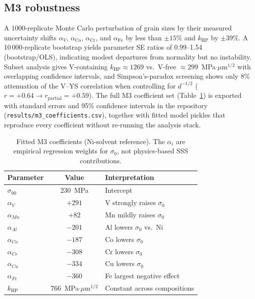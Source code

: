 \documentclass[11pt]{article}
\begin{document}
\subsection{M3 robustness}
A 1000-replicate Monte Carlo perturbation of grain sizes by their measured uncertainty shifts $\alpha_V$, $\alpha_\text{Co}$, $\alpha_\text{Cr}$, and $\alpha_\text{Fe}$ by less than $\pm 15\%$ and $k_\text{HP}$ by $\pm 39\%$. A 10\,000-replicate bootstrap yields parameter SE ratios of 0.99--1.54 (bootstrap/OLS), indicating modest departures from normality but no instability. Subset analysis gives V-containing $k_\text{HP} \approx 1269$ vs.\ V-free $\approx 299$~MPa$\cdot\mu$m$^{1/2}$ with overlapping confidence intervals, and Simpson's-paradox screening shows only 8\% attenuation of the V--YS correlation when controlling for $d^{-1/2}$ ($r = +0.64 \to r_\text{partial} = +0.59$). The full M3 coefficient set (Table~\ref{tab:m3_coef}) is exported with standard errors and 95\% confidence intervals in the repository (\texttt{results/m3\_coefficients.csv}), together with fitted model pickles that reproduce every coefficient without re-running the analysis stack.

\begin{table}[htb]
\centering
\caption{Fitted M3 coefficients (Ni-solvent reference). The $\alpha_i$ are empirical regression weights for $\sigma_0$, not physics-based SSS contributions.}
\label{tab:m3_coef}
\small
\begin{tabular}{lcl}
\toprule
Parameter & Value & Interpretation \\
\midrule
$\sigma_{00}$ & 230~\si{MPa} & Intercept \\
$\alpha_V$    & $+291$ & V strongly raises $\sigma_0$ \\
$\alpha_{Mn}$ & $+82$  & Mn mildly raises $\sigma_0$ \\
$\alpha_{Al}$ & $-201$ & Al lowers $\sigma_0$ vs.\ Ni \\
$\alpha_{Co}$ & $-187$ & Co lowers $\sigma_0$ \\
$\alpha_{Cr}$ & $-308$ & Cr lowers $\sigma_0$ \\
$\alpha_{Cu}$ & $-334$ & Cu lowers $\sigma_0$ \\
$\alpha_{Fe}$ & $-360$ & Fe largest negative effect \\
$k_\text{HP}$ & $766$~MPa$\cdot\mu$m$^{1/2}$ & Constant across compositions \\
\bottomrule
\end{tabular}
\end{table}
\end{document}
